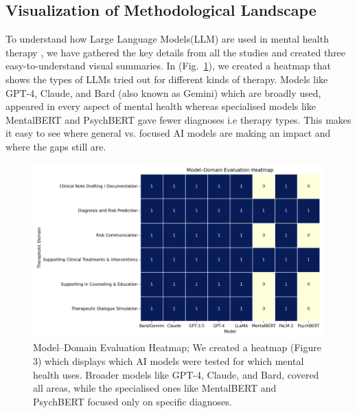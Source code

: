 \documentclass[sn-basic,authoryear]{sn-jnl}
\begin{document}
\subsection{Visualization of Methodological Landscape}
To understand how Large Language Models(LLM) are used in mental health therapy , we have gathered the key details from all the studies and created three easy-to-understand visual summaries. In (Fig.~\ref{fig:metric_frequency}), we created a heatmap that shows the types of LLMs tried out for different kinds of therapy. Models like GPT-4, Claude, and Bard (also known as Gemini) which are broadly used, appeared in every aspect of mental health whereas specialised models like MentalBERT and PsychBERT gave fewer diagnoses i.e therapy types. This makes it easy to see where general vs. focused AI models are making an impact and where the gaps still are.
\begin{figure}
    \centering
    \includegraphics[width=1.0\linewidth]{chart (1).png}
    \caption{Model–Domain Evaluation Heatmap; 
 We created a heatmap (Figure 3) which displays which AI models were tested for which mental health uses.  Broader models like GPT-4, Claude, and Bard, covered all areas, while the specialised ones like MentalBERT and PsychBERT focused only on specific diagnoses.}
    \label{fig:metric_frequency}
\end{figure}
\end{document}
